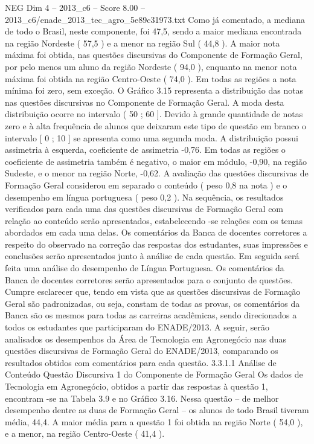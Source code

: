 \begin{textsample}{NEG Dim 4 – 2013\_c6 – Score 8.00 – 2013\_c6/enade\_2013\_tec\_agro\_5e89c31973.txt}
Como já comentado, a mediana de todo o Brasil, neste componente, foi 47,5, sendo a maior mediana encontrada na região Nordeste ( 57,5 ) e a menor na região Sul ( 44,8 ).
A maior nota máxima foi obtida, nas questões discursivas do Componente de Formação Geral, por pelo menos um aluno da região Nordeste ( 94,0 ), enquanto na menor nota máxima foi obtida na região Centro-Oeste ( 74,0 ).
Em todas as regiões a nota mínima foi zero, sem exceção.
O Gráfico 3.15 representa a distribuição das notas nas questões discursivas no Componente de Formação Geral.
A moda desta distribuição ocorre no intervalo ( 50 ; 60 ].
Devido à grande quantidade de notas zero e à alta frequência de alunos que deixaram este tipo de questão em branco o intervalo [ 0 ; 10 ] se apresenta como uma segunda moda.
A distribuição possui assimetria à esquerda, coeficiente de assimetria -0,76.
Em todas as regiões o coeficiente de assimetria também é negativo, o maior em módulo, -0,90, na região Sudeste, e o menor na região Norte, -0,62.
A avaliação das questões discursivas de Formação Geral considerou em separado o conteúdo ( peso 0,8 na nota ) e o desempenho em língua portuguesa ( peso 0,2 ).
Na sequência, os resultados verificados para cada uma das questões discursivas de Formação Geral com relação ao conteúdo serão apresentados, estabelecendo -se relações com os temas abordados em cada uma delas.
Os comentários da Banca de docentes corretores a respeito do observado na correção das respostas dos estudantes, suas impressões e conclusões serão apresentados junto à análise de cada questão.
Em seguida será feita uma análise do desempenho de Língua Portuguesa.
Os comentários da Banca de docentes corretores serão apresentados para o conjunto de questões.
Cumpre esclarecer que, tendo em vista que as questões discursivas de Formação Geral são padronizadas, ou seja, constam de todas as provas, os comentários da Banca são os mesmos para todas as carreiras acadêmicas, sendo direcionados a todos os estudantes que participaram do ENADE/2013.
A seguir, serão analisados os desempenhos da Área de Tecnologia em Agronegócio nas duas questões discursivas de Formação Geral do ENADE/2013, comparando os resultados obtidos com comentários para cada questão. 3.3.1.1 Análise de Conteúdo Questão Discursiva 1 do Componente de Formação Geral Os dados de Tecnologia em Agronegócio, obtidos a partir das respostas à questão 1, encontram -se na Tabela 3.9 e no Gráfico 3.16.
Nessa questão – de melhor desempenho dentre as duas de Formação Geral – os alunos de todo Brasil tiveram média, 44,4.
A maior média para a questão 1 foi obtida na região Norte ( 54,0 ), e a menor, na região Centro-Oeste ( 41,4 ).

\end{textsample}
